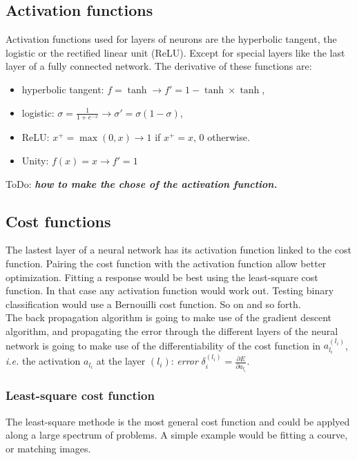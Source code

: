 \documentclass[final, paper=letter,5p,times,twocolumn]{elsarticle}
\newcommand{\ToDo}[1]{ToDo: \textbf{\textit{#1}}}
\begin{document}
\subsection{Activation functions}

Activation functions used for layers of neurons are the hyperbolic tangent, the logistic or the rectified linear unit (ReLU). Except for special layers like the last layer of a fully connected network. The derivative of these functions are:

\begin{itemize}
\item hyperbolic tangent: $f = \tanh \rightarrow f' = 1 - \tanh \times \tanh$,
\item logistic: $\sigma = \frac{1}{1+e^{-x}} \rightarrow \sigma' = \sigma (1 - \sigma)$,
\item ReLU: $x^{+} = \max(0,x) \rightarrow 1$ if $x^{+} = x$, 0 otherwise.
\item Unity: $f(x) = x \rightarrow f' = 1$
\end{itemize}
\ToDo{how to make the chose of the activation function.}

\subsection{Cost functions}
\label{sec:cost_functions}

The lastest layer of a neural network has its activation function linked to the cost function. Pairing the cost function with the activation function allow better optimization. Fitting a response would be best using the least-square cost function. In that case any activation function would work out. Testing binary classification would use a Bernouilli cost function. So on and so forth.\\
The back propagation algorithm is going to make use of the gradient descent algorithm, and propagating the error through the different layers of the neural network is going to make use of the differentiability of the cost function in $a_{l_{i}}^{(l_{i})}$, {\it i.e.} the activation $a_{l_{i}}$ at the layer $(l_{i})$: {\it error} $\delta_{i}^{(l_{i})} = \frac{\partial E}{\partial a_{l_{i}}}$.

\subsubsection{Least-square cost function}

The least-square methode is the most general cost function and could be applyed along a large spectrum of problems. A simple example would be fitting a courve, or matching images. 
\end{document}
